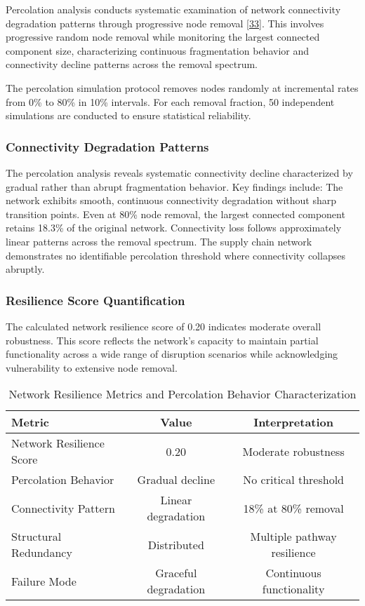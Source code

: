 \documentclass[a4 paper, 11pt,twoside]{article}
\newcommand{\0}{\Bf{0}}
\theoremstyle{definition}
\begin{document}
Percolation analysis conducts systematic examination of network connectivity degradation patterns through progressive node removal \hyperref[ref33]{[33]}. This involves progressive random node removal while monitoring the largest connected component size, characterizing continuous fragmentation behavior and connectivity decline patterns across the removal spectrum.

The percolation simulation protocol removes nodes randomly at incremental rates from 0\% to 80\% in 10\% intervals. For each removal fraction, 50 independent simulations are conducted to ensure statistical reliability.

\subsubsection{Connectivity Degradation Patterns}

The percolation analysis reveals systematic connectivity decline characterized by gradual rather than abrupt fragmentation behavior. Key findings include: The network exhibits smooth, continuous connectivity degradation without sharp transition points. Even at 80\% node removal, the largest connected component retains 18.3\% of the original network. Connectivity loss follows approximately linear patterns across the removal spectrum. The supply chain network demonstrates no identifiable percolation threshold where connectivity collapses abruptly.

\subsubsection{Resilience Score Quantification}
The calculated network resilience score of 0.20 indicates moderate overall robustness. This score reflects the network's capacity to maintain partial functionality across a wide range of disruption scenarios while acknowledging vulnerability to extensive node removal.

\begin{table}[H]
\centering
\caption{Network Resilience Metrics and Percolation Behavior Characterization}
\begin{tabular}{lcc}
\toprule
\textbf{Metric} & \textbf{Value} & \textbf{Interpretation} \\
\midrule
Network Resilience Score & 0.20 & Moderate robustness \\
Percolation Behavior & Gradual decline & No critical threshold \\
Connectivity Pattern & Linear degradation & 18\% at 80\% removal \\
Structural Redundancy & Distributed & Multiple pathway resilience \\
Failure Mode & Graceful degradation & Continuous functionality \\
\bottomrule
\end{tabular}
\end{table}
\end{document}
